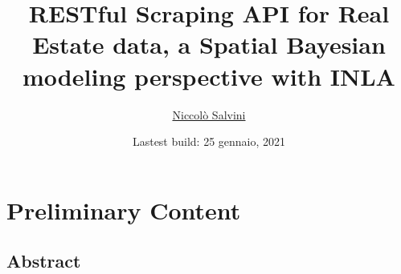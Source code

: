 \documentclass[
  12pt,
  a4paper,
  oneside]{book}
\title{RESTful Scraping API for Real Estate data, a Spatial Bayesian modeling perspective with INLA}
\author{\href{https://niccolosalvini.netlify.app/}{Niccolò Salvini}}
\date{Lastest build: 25 gennaio, 2021}
\let\oldmaketitle\maketitle
\theoremstyle{definition}
\theoremstyle{definition}
\theoremstyle{definition}
\theoremstyle{remark}
\begin{document}
\maketitle


\newpage

\let\maketitle\oldmaketitle
\maketitle

{
\setcounter{tocdepth}{2}
\tableofcontents
}
\listoftables
\listoffigures
{}
\hypertarget{preliminary-content}{%
\chapter*{Preliminary Content}\label{preliminary-content}}

\hypertarget{abstract}{%
\section*{Abstract}\label{abstract}}
\end{document}

